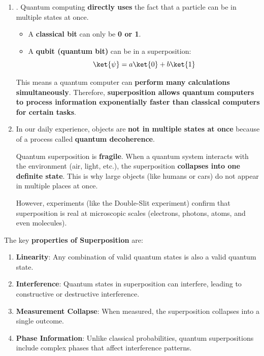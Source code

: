 \begin{enumerate}
    \item {}. Quantum computing \textbf{directly uses} the fact that a particle can be in multiple states at once.

    \begin{itemize}
        \item A \textbf{classical bit} can only be \textbf{0 or 1}.
        \item A \textbf{qubit (quantum bit)} can be in a superposition:
        \begin{equation*}
        \ket{\psi} = a \ket{0} + b \ket{1}
        \end{equation*}
    \end{itemize}
    This means a quantum computer can \textbf{perform many calculations simultaneously}. Therefore, \textbf{superposition allows quantum computers to process information exponentially faster than classical computers for certain tasks}.

    
    \item {} In our daily experience, objects are \textbf{not in multiple states at once} because of a process called \textbf{quantum decoherence}.

    Quantum superposition is \textbf{fragile}. When a quantum system interacts with the environment (air, light, etc.), the superposition \textbf{collapses into one definite state}. This is why large objects (like humans or cars) do not appear in multiple places at once.
    
    However, experiments (like the Double-Slit experiment) confirm that superposition is real at microscopic scales (electrons, photons, atoms, and even molecules).
\end{enumerate}
The key \textbf{properties of Superposition} are:
\begin{enumerate}
    \item \textbf{Linearity}: Any combination of valid quantum states is also a valid quantum state.
    \item \textbf{Interference}: Quantum states in superposition can interfere, leading to constructive or destructive interference.
    \item \textbf{Measurement Collapse}: When measured, the superposition collapses into a single outcome.
    \item \textbf{Phase Information}: Unlike classical probabilities, quantum superpositions include complex phases that affect interference patterns.
\end{enumerate}

